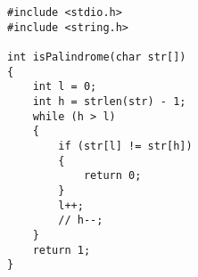 
\begin{minipage}{14cm}
\begin{lstlisting}[style=CStyle, caption=Mutant M5 of function isPalindrome., label=isPalindrome_m5]
#include <stdio.h> 
#include <string.h> 

int isPalindrome(char str[]) 
{ 
    int l = 0; 
    int h = strlen(str) - 1; 
    while (h > l) 
    { 
        if (str[l] != str[h]) 
        { 
            return 0;
        } 
        l++;
        // h--;
    } 
    return 1; 
} 
\end{lstlisting}
\end{minipage}